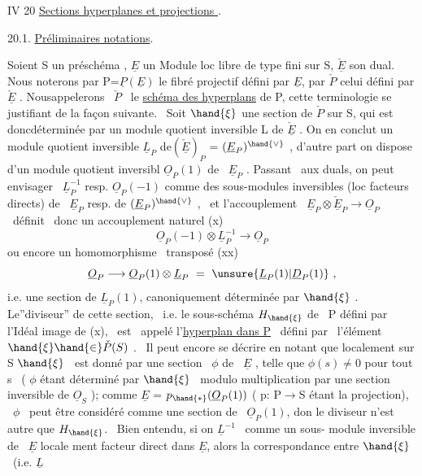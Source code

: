 IV 20 \quad \uline{Sections hyperplanes et projections }.

20.1. \quad \uline{Préliminaires  notations}.

Soient S un \quad préschéma , $\underline{E}$ un Module loc libre de type fini sur S,
$\check{\underline{E}}$ son dual. Nous noterons par P=$\underline{P}(\underline{E})$ le fibré projectif défini par $\underline{E}$,
par $\check{P}$ celui défini par $\check{\underline{E}}$ . Nous\hand{|}appelerons \ $\check{P}$ \ le \uline{schéma des hyperplans}
de P, cette terminologie se justifiant de la façon suivante. \ Soit
$\hand{\xi}$ une section de $\check{P}$ sur S, qui est donc\hand{/}déterminée par un module quotient
inversible L de $\check{\underline{E}}$ . On en conclut un module quotient inversible
$\underline{L}_P$ de$(\check{\underline{E}})_P$ = $(\underline{E}_P)^{\hand{\vee}}$ , d'autre part on dispose d'un module quotient inversibl
$\underline{O}_P(1)$ de \ $\underline{E}_P$ . Passant \ aux duals, on peut envisager \ $\underline{L}_P^{-1}$ resp. $\underline{O}_P(-1)$
comme des sous-modules inversibles (loc facteurs directs) de \ $\underline{E}_P$ resp.
de $(\underline{E}_P)^{\hand{\vee}}$ , \ et l'accouplement \ $\underline{E}_P \otimes \check{\underline{E}}_P \longrightarrow \underline{O}_P$ \ définit \ donc un
accouplement naturel
(x) \[ \underline{O}_P(-1)\otimes\underline{L}_P^{-1} \to \underline{O}_P \]
ou encore un homomorphisme \ transposé
(xx) \[ \underline{O}_P \longrightarrow \underline{O}_P(1)\otimes\underline{L}_P \ = \ \unsure{\underline{L}_P(1)|\underline{D}_P(1)} \ , \]
i.e. une section de $\underline{L}_P(1)$, canoniquement déterminée par $\hand{\xi}$ . Le''diviseur''
de cette section, \ i.e. le sous-schéma $H_{\hand{\xi}}$ de \ P défini par l'Idéal
image de (x), \ est \ appelé l'\uline{hyperplan dans P} \ défini par \ l'élément
$\hand{\xi} \hand{\in} \check{P}(S)$ . \ Il peut encore se décrire en notant que localement sur S 
 \quad $\hand{\xi}$ \ est donné par une section \ $\phi$ de \ $\underline{E}$ ,  telle
 que $\phi(s) \neq 0$ pour tout s \ ( $\phi$ étant déterminé par $\hand{\xi}$ \ modulo
multiplication par une section inversible de $\underline{O}_S$ ); comme $\underline{E}$ = $p_{\hand{*}}(\underline{O}_P(1))$
( p: P$\to$S étant la projection), \ $\phi$ \ peut être considéré comme une section
de \ $\underline{O}_P(1)$, don le diviseur n'est autre que $H_{\hand{\xi}}$. \ Bien entendu, si on
 $\underline{L}^{-1}$ \ comme un sous- module inversible de \ $\underline{E}$ locale
ment facteur direct dans $\underline{E}$, alors la correspondance entre $\hand{\xi}$ \ (i.e. $\underline{L}$ \hand{\unsure{$\xi$,}}

